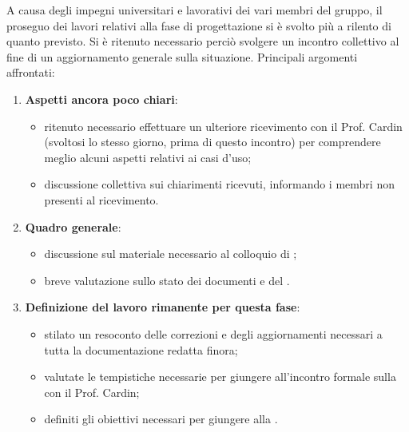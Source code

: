 A causa degli impegni universitari e lavorativi dei vari  membri del gruppo, il proseguo dei lavori relativi alla fase di progettazione si è svolto più a rilento di quanto previsto. Si è ritenuto necessario perciò svolgere un incontro collettivo al fine di un aggiornamento generale sulla situazione.
Principali argomenti affrontati:
\begin{enumerate}
    \item \textbf{Aspetti ancora poco chiari}:
        \begin{itemize}
            \item ritenuto necessario effettuare un ulteriore ricevimento con il Prof. Cardin (svoltosi lo stesso giorno, prima di questo incontro) per comprendere meglio alcuni aspetti relativi ai casi d'uso;
            \item discussione collettiva sui chiarimenti ricevuti, informando i membri non presenti al ricevimento.
        \end{itemize}
    \item \textbf{Quadro generale}:
        \begin{itemize}
            \item discussione sul materiale necessario al colloquio di ;
            \item breve valutazione sullo stato dei documenti e del .
        \end{itemize}
    \item \textbf{Definizione del lavoro rimanente per questa fase}:
        \begin{itemize}
            \item stilato un resoconto delle correzioni e degli aggiornamenti necessari a tutta la documentazione redatta finora;
            \item valutate le tempistiche necessarie per giungere all'incontro formale sulla  con il Prof. Cardin;
            \item definiti gli obiettivi necessari per giungere alla \RP.
        \end{itemize}
\end{enumerate}
